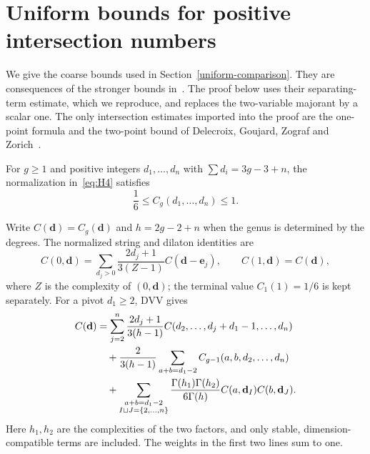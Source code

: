 \section{Uniform bounds for positive intersection numbers}
\label{app:primitive-bounds}

We give the coarse bounds used in Section~\ref{uniform-comparison}.
They are consequences of the stronger bounds in~\cite[Lemmas~2--6]{GYZ}.
The proof below uses their separating-term estimate, which we reproduce,
and replaces the two-variable majorant by a scalar one. The only
intersection estimates imported into the proof are the one-point formula
and the two-point bound of Delecroix, Goujard, Zograf and
Zorich~\cite[equation~(6)]{DGZZBounds}.

\begin{lemma}\label{lem:primitive-bounds}
For $g\ge1$ and positive integers $d_1,\ldots,d_n$ with
$\sum d_i=3g-3+n$, the normalization in~\eqref{eq:H4} satisfies
\[
 \frac16\le C_g(d_1,\ldots,d_n)\le1.
\]
\end{lemma}

Write $C(\mathbf d)=C_g(\mathbf d)$ and $h=2g-2+n$ when the
genus is determined by the degrees. The normalized string and dilaton
identities are
\begin{equation}
 C(0,\mathbf d)=\sum_{d_j>0}\frac{2d_j+1}{3(Z-1)}
                    C(\mathbf d-\mathbf e_j),\qquad
 C(1,\mathbf d)=C(\mathbf d),
 \label{eq:primitive-string}
\end{equation}
where $Z$ is the complexity of $(0,\mathbf d)$; the terminal value
$C_1(1)=1/6$ is kept separately. For a pivot $d_1\ge2$, DVV gives
\begin{align}
 C(\mathbf d)&=\sum_{j=2}^n\frac{2d_j+1}{3(h-1)}
 C(d_2,\ldots,d_j+d_1-1,\ldots,d_n)\notag\\
 &\quad+\frac{2}{3(h-1)}\sum_{a+b=d_1-2}
 C_{g-1}(a,b,d_2,\ldots,d_n)\notag\\
 &\quad+\sum_{\substack{a+b=d_1-2\\I\sqcup J=\{2,\ldots,n\}}}
 \frac{\Gamma(h_1)\Gamma(h_2)}{6\Gamma(h)}
 C(a,\mathbf d_I)C(b,\mathbf d_J).
 \label{eq:primitive-dvv}
\end{align}
Here $h_1,h_2$ are the complexities of the two factors, and only stable,
dimension-compatible terms are included. The weights in the first two
lines sum to one.

